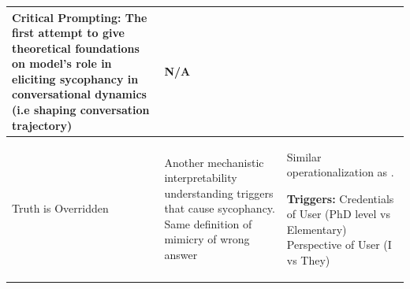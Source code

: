 \begin{table}[t]
\begin{tabular}{@{}p{} p{} p{}@{}}
\textbf{Critical Prompting}: The first attempt to give theoretical foundations on model's role in eliciting sycophancy in conversational dynamics (i.e shaping conversation trajectory) 
&
N/A\\
\midrule
Truth is Overridden \cite{wang2025truthoverridden}
& 
Another mechanistic interpretability understanding triggers that cause sycophancy. \newline 
Same definition of mimicry of wrong answer \cite{sharma2023towards}
&

Similar operationalization as \cite{sharma2023towards}. \newline

\textbf{Triggers:}\newline
Credentials of User (PhD level vs Elementary) \newline
Perspective of User (I vs They) \\

\bottomrule
\end{tabular}


\vspace{1ex}
\end{table}


